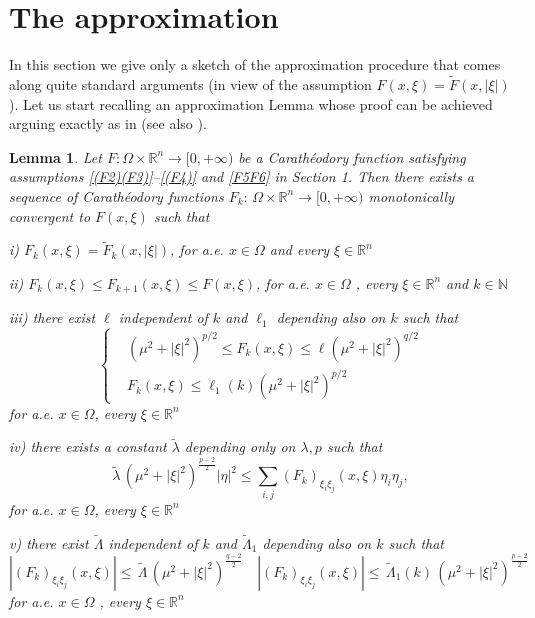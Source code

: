 \documentclass[12pt]{amsart}
\newtheorem{lemma}[theorem]{Lemma}
\theoremstyle{definition}
\numberwithin{equation}{section}
\numberwithin{equation}{section}
\begin{document}
{ \section{The approximation}

\label{quattro}

In this section we give only a sketch of  the approximation procedure that comes along quite standard arguments (in view of the assumption $F(x, \xi) = \tilde{F}(x, |\xi|)$).
Let us start recalling an approximation Lemma whose proof can be achieved arguing exactly as in   \cite[Lemma 4.1]{CupGuiMas} (see also \cite[Lemma 4.2]{CGGP}).
\begin{lemma}\label{approx} Let $F:\Omega\times \mathbb{R}^n\to [0,+\infty)$ be a Carath\'eodory function satisfying assumptions {\eqref{(F2)(F3)}--\eqref{(F4)}} {and \eqref{F5F6}} in Section 1.  Then there exists a sequence of Carath\'eodory functions $F_k:\,\Omega\times \mathbb{R}^n\to [0,+\infty)$ monotonically convergent to $F(x,\xi)$ such that
\medskip

i) $F_k(x, \xi)=\tilde F_k(x, |\xi|)$, for a.e. $x\in \Omega$ and every $\xi\in \mathbb{R}^n$

ii) $F_k(x, \xi)\le  F_{k+1}(x, \xi)\le F(x,\xi)$, for a.e. $x\in \Omega$ , every $\xi\in \mathbb{R}^n$ and  $k\in\mathbb{N}$

iii) there exist $\ell$ independent of $k$ and $\ell_1$ depending also on $k$ such that
\begin{equation}
\label{(A1)}
\left \{
\begin{array}{lll}
&  (\mu^2 + |\xi|^2)^{p/2}\le  F_k(x, \xi) \le \ell (\mu^2 + |\xi|^2)^{q/2} 
\\[1mm]
& F_k(x, \xi) \le \ell_1(k) (\mu^2 + |\xi|^2)^{p/2}  
\end{array}
\right.
\end{equation}
for a.e. $x\in \Omega$, every $\xi\in \mathbb{R}^n$

iv) there exists a constant $\tilde\lambda$ depending only on $\lambda, p$ such that
\begin{equation}
\label{(A2)}
\tilde\lambda \, (\mu^2 + |\xi|^2)^{\frac{p-2}{2}} |\eta|^2 \le \sum_{i,j} (F_k)_{\xi_i \xi_j}(x, \xi) \eta_i \eta_j, 
\end{equation}
 for a.e. $x\in \Omega$, every $\xi\in \mathbb{R}^n$
 
v)  there exist $\tilde\Lambda$ independent of $k$ and $\tilde\Lambda_1$ depending also on $k$ such that
\begin{equation}
\label{(A3)}
|(F_k)_{\xi_i \xi_j}(x, \xi)| \le \, \tilde\Lambda \, (\mu^2 + |\xi|^2)^{\frac{q-2}{2}} \quad |(F_k)_{\xi_i \xi_j}(x, \xi)| \le \, \tilde\Lambda_1(k) \, (\mu^2 + |\xi|^2)^{\frac{p-2}{2}}  
\end{equation}
for a.e. $x\in \Omega$ , every $\xi\in \mathbb{R}^n$


\end{lemma}}
\end{document}
